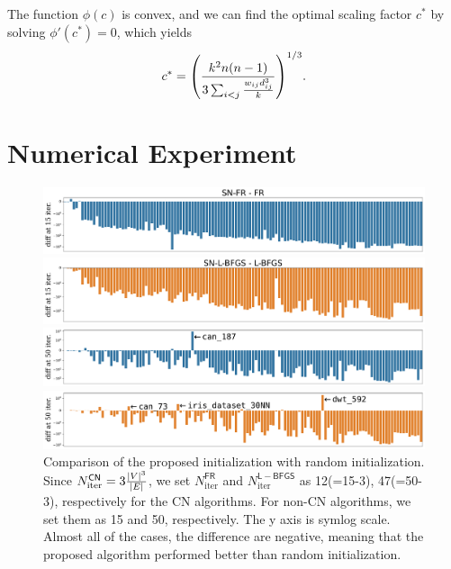 \documentclass[dvipdfmx,10pt,journal,compsoc]{IEEEtran}
\begin{document}
The function $\phi(c)$ is convex, and we can find the optimal scaling factor $c^*$ by solving $\phi'(c^*) = 0$, which yields
\begin{equation*}
    c^* = \qty(\frac{k^2 n(n-1)}{3 \sum_{i < j} \frac{w_{ij} d_{ij}^3}{k}})^{1/3}.
\end{equation*}

\section{Numerical Experiment} \label{sec:experiment}

\begin{figure}[t]
    \centering
    \begin{minipage}{\columnwidth}
        \centering
        \includegraphics[width=\columnwidth]{overall/plot/diff_FR_15.pdf}
    \end{minipage}
    \begin{minipage}{\columnwidth}
        \centering
        \includegraphics[width=\columnwidth]{overall/plot/diff_L-BFGS_15.pdf}
    \end{minipage}
    \begin{minipage}{\columnwidth}
        \centering
        \includegraphics[width=\columnwidth]{overall/plot/diff_FR_50.pdf}
    \end{minipage}
    \begin{minipage}{\columnwidth}
        \centering
        \includegraphics[width=\columnwidth]{overall/plot/diff_L-BFGS_50.pdf}
    \end{minipage}
    \caption{
        Comparison of the proposed initialization with random initialization.
        Since $N_\mathrm{iter}^\mathsf{CN} = 3 \frac{\abs{V}^3}{\abs{E}}$, we set $N_\mathrm{iter}^\mathsf{FR}$ and $N_\mathrm{iter}^\mathsf{L-BFGS}$ as 12(=15-3), 47(=50-3), respectively for the \textsf{CN} algorithms. For non-\textsf{CN} algorithms, we set them as 15 and 50, respectively.
        The y axis is symlog scale.
        Almost all of the cases,
        the difference are negative, meaning that the proposed algorithm performed better than random initialization.
    }
    \label{fig:diff_L_BFGS}
\end{figure}
\end{document}
